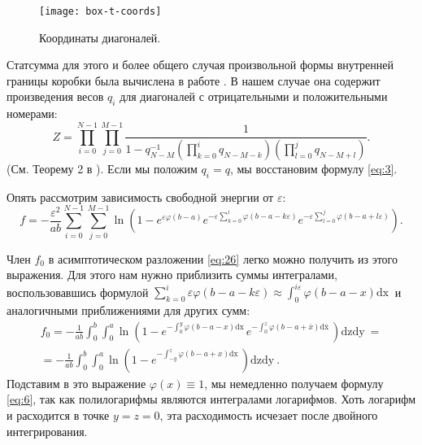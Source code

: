 \documentclass{article}
\newcommand{\dx}{\mathrm{dx}~}
\newcommand{\dxb}{\mathrm{d\bar x}~}
\newcommand{\dy}{\mathrm{dy}~}
\newcommand{\dz}{\mathrm{dz}}
\begin{document}
\begin{figure}[htbp]
  \texttt{[image: box-t-coords]}
  \caption{\label{fig:box-t-coords} Координаты диагоналей.}
\end{figure}

Статсумма для этого и более общего случая произвольной формы внутренней границы коробки была
вычислена в работе  \cite{okounkov2007random}. В нашем случае она содержит произведения весов
$q_{i}$ для диагоналей с отрицательными и положительными номерами:
\begin{equation}
  \label{eq:13}
  Z=\prod_{i=0}^{N-1}\prod_{j=0}^{M-1} \frac{1}{1-q_{N-M}^{-1}\left(\prod_{k=0}^{i}q_{N-M-k}\right)\left(\prod_{l=0}^{j}q_{N-M+l}\right)}.
\end{equation}
(См. Теорему 2 в \cite{okounkov2007random}).
Если мы положим  $q_{i}=q$,  мы восстановим формулу \eqref{eq:3}.

Опять рассмотрим зависимость свободной энергии от $\varepsilon$:
\begin{equation}
  \label{eq:21}
  f=-\frac{\varepsilon^{2}}{ab}\sum_{i=0}^{N-1}\sum_{j=0}^{M-1}\ln
  \left(1-e^{\varepsilon \varphi(b-a)}e^{-\varepsilon\sum_{k=0}^{i}\varphi\left(b-a-k\varepsilon\right)}
    e^{-\varepsilon\sum_{l=0}^{j}\varphi\left(b-a+l\varepsilon\right)} \right).
\end{equation}

Член  $f_{0}$ в асимптотическом разложении  \eqref{eq:26} легко можно получить из этого выражения.
Для этого нам нужно приблизить суммы интегралами, воспользовавшись формулой
$\sum_{k=0}^{i}\varepsilon\varphi(b-a-k\varepsilon)\approx
\int_{0}^{i\varepsilon}\varphi(b-a-x)\dx$%
и аналогичными приближениями для других сумм:
\begin{multline}
  \label{eq:74}
  f_{0}=-\frac{1}{ab}\int_{0}^{b}\int_{0}^{a}\ln
  \left(1-e^{-\int_{0}^{y}\varphi\left(b-a-x\right)\dx}
    e^{-\int_{0}^{z}\varphi\left(b-a+\bar x\right)\dxb} \right)\dz\dy=\\
  =-\frac{1}{ab}\int_{0}^{b}\int_{0}^{a}\ln
  \left(1-e^{-\int_{-y}^{z}\varphi\left(b-a+x\right)\dx} \right)\dz\dy.
\end{multline}
Подставим в это выражение  $\varphi(x)\equiv 1$, мы немедленно получаем формулу \eqref{eq:6}, так
как полилогарифмы являются интегралами логарифмов. Хоть логарифм и расходится в точке $y=z=0$, эта
расходимость исчезает после двойного интегрирования. 
\end{document}
